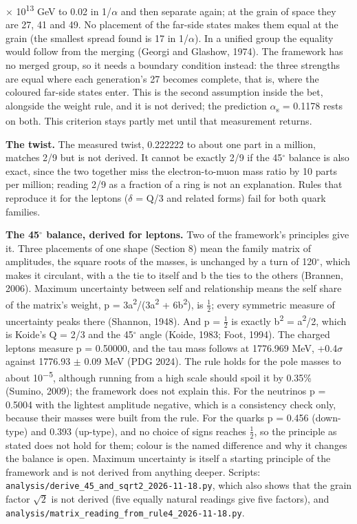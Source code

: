 \documentclass[
  11pt,
]{article}
\begin{document}
\ensuremath{\times} 10\textsuperscript{13} GeV to 0.02 in 1/\ensuremath{\alpha} and then separate again; at the grain of space they are 27, 41 and 49. No placement of the far-side states makes them equal at the grain (the smallest spread found is 17 in 1/\ensuremath{\alpha}). In a unified group the equality would follow from the merging (Georgi and Glashow, 1974). The framework has no merged group, so it needs a boundary condition instead: the three strengths are equal where each generation's 27 becomes complete, that is, where the coloured far-side states enter. This is the second assumption inside the bet, alongside the weight rule, and it is not derived; the prediction \ensuremath{\alpha}\textsubscript{s} = 0.1178 rests on both. This criterion stays partly met until that measurement returns.

\textbf{The twist.} The measured twist, 0.222222 to about one part in a million, matches 2/9 but is not derived. It cannot be exactly 2/9 if the 45\ensuremath{^\circ} balance is also exact, since the two together miss the electron-to-muon mass ratio by 10 parts per million; reading 2/9 as a fraction of a ring is not an explanation. Rules that reproduce it for the leptons (\ensuremath{\delta} = Q/3 and related forms) fail for both quark families.

\textbf{The 45\ensuremath{^\circ} balance, derived for leptons.} Two of the framework's principles give it. Three placements of one shape (Section 8) mean the family matrix of amplitudes, the square roots of the masses, is unchanged by a turn of 120\ensuremath{^\circ}, which makes it circulant, with a the tie to itself and b the ties to the others (Brannen, 2006). Maximum uncertainty between self and relationship means the self share of the matrix's weight, p = 3a\textsuperscript{2}/(3a\textsuperscript{2} + 6\textbar b\textbar{}\textsuperscript{2}), is \ensuremath{\frac{1}{2}}; every symmetric measure of uncertainty peaks there (Shannon, 1948). And p = \ensuremath{\frac{1}{2}} is exactly \textbar b\textbar{}\textsuperscript{2} = a\textsuperscript{2}/2, which is Koide's Q = 2/3 and the 45\ensuremath{^\circ} angle (Koide, 1983; Foot, 1994). The charged leptons measure p = 0.50000, and the tau mass follows at 1776.969 MeV, +0.4\ensuremath{\sigma} against 1776.93 \ensuremath{\pm} 0.09 MeV (PDG 2024). The rule holds for the pole masses to about 10\textsuperscript{\ensuremath{-}5}, although running from a high scale should spoil it by 0.35\% (Sumino, 2009); the framework does not explain this. For the neutrinos p = 0.5004 with the lightest amplitude negative, which is a consistency check only, because their masses were built from the rule. For the quarks p = 0.456 (down-type) and 0.393 (up-type), and no choice of signs reaches \ensuremath{\frac{1}{2}}, so the principle as stated does not hold for them; colour is the named difference and why it changes the balance is open. Maximum uncertainty is itself a starting principle of the framework and is not derived from anything deeper. Scripts: \texttt{analysis/derive\_45\_and\_sqrt2\_2026-11-18.py}, which also shows that the grain factor \ensuremath{\sqrt{2}} is not derived (five equally natural readings give five factors), and \texttt{analysis/matrix\_reading\_from\_rule4\_2026-11-18.py}.
\end{document}
